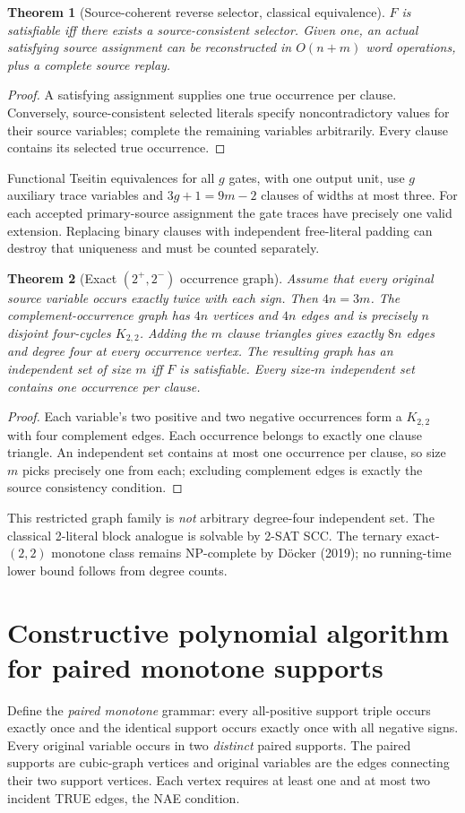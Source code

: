 \documentclass[10pt]{article}
\newtheorem{theorem}{Theorem}
\begin{document}
\begin{theorem}[Source-coherent reverse selector, classical equivalence]
$F$ is satisfiable iff there exists a source-consistent selector. Given one, an actual satisfying source assignment can be reconstructed in $O(n+m)$ word operations, plus a complete source replay.
\end{theorem}
\begin{proof}
A satisfying assignment supplies one true occurrence per clause. Conversely, source-consistent selected literals specify noncontradictory values for their source variables; complete the remaining variables arbitrarily. Every clause contains its selected true occurrence.
\end{proof}

Functional Tseitin equivalences for all $g$ gates, with one output unit, use $g$ auxiliary trace variables and $3g+1=9m-2$ clauses of widths at most three. For each accepted primary-source assignment the gate traces have precisely one valid extension. Replacing binary clauses with independent free-literal padding can destroy that uniqueness and must be counted separately.

\begin{theorem}[Exact $(2^+,2^-)$ occurrence graph]
Assume that every original source variable occurs exactly twice with each sign. Then $4n=3m$. The complement-occurrence graph has $4n$ vertices and $4n$ edges and is precisely $n$ disjoint four-cycles $K_{2,2}$. Adding the $m$ clause triangles gives exactly $8n$ edges and degree four at every occurrence vertex. The resulting graph has an independent set of size $m$ iff $F$ is satisfiable. Every size-$m$ independent set contains one occurrence per clause.
\end{theorem}
\begin{proof}
Each variable's two positive and two negative occurrences form a $K_{2,2}$ with four complement edges. Each occurrence belongs to exactly one clause triangle. An independent set contains at most one occurrence per clause, so size $m$ picks precisely one from each; excluding complement edges is exactly the source consistency condition.
\end{proof}
This restricted graph family is \emph{not} arbitrary degree-four independent set. The classical 2-literal block analogue is solvable by 2-SAT SCC. The ternary exact-$(2,2)$ monotone class remains NP-complete by D\"ocker (2019); no running-time lower bound follows from degree counts.

\section{Constructive polynomial algorithm for paired monotone supports}
Define the \emph{paired monotone} grammar: every all-positive support triple occurs exactly once and the identical support occurs exactly once with all negative signs. Every original variable occurs in two \emph{distinct} paired supports. The paired supports are cubic-graph vertices and original variables are the edges connecting their two support vertices. Each vertex requires at least one and at most two incident TRUE edges, the NAE condition.
\end{document}
